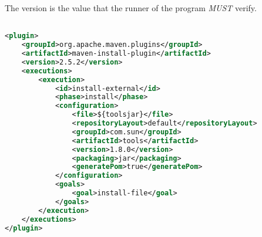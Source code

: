 The version is the value that the runner of the program \emph{MUST} verify.
\begin{lstlisting}[language=XML,caption={How to 'mvn install' the tools.jar},label={lst:instToolsJar}]% Start your code-block

<plugin>
	<groupId>org.apache.maven.plugins</groupId>
	<artifactId>maven-install-plugin</artifactId>
	<version>2.5.2</version>
	<executions>
		<execution>
			<id>install-external</id>
			<phase>install</phase>
			<configuration>
				<file>${toolsjar}</file>
				<repositoryLayout>default</repositoryLayout>
				<groupId>com.sun</groupId>
				<artifactId>tools</artifactId>
				<version>1.8.0</version>
				<packaging>jar</packaging>
				<generatePom>true</generatePom>
			</configuration>
			<goals>
				<goal>install-file</goal>
			</goals>
		</execution>
	</executions>
</plugin>
\end{lstlisting}
